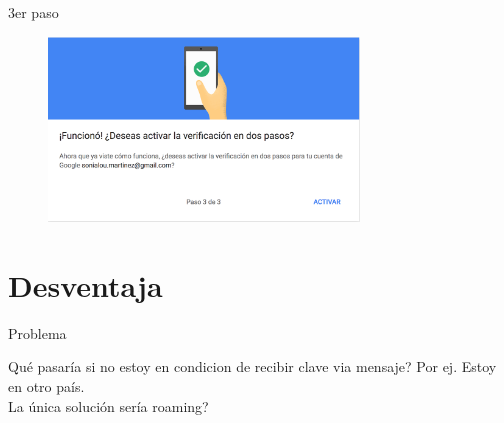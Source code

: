 \documentclass[11pt]{beamer}
\begin{document}
\begin{frame}{3er paso}
  \begin{figure}
    \includegraphics[width=3.25in]{3paso.png}
  \end{figure}
\end{frame}
\section{Desventaja}
\begin{frame}{Problema}
  \begin{block}{Qu\'e pasar\'ia si no estoy en condicion de recibir clave via mensaje?}
    Por ej. Estoy en otro pa\'is. \\
    \color[rgb]{1,0,0} La \'unica soluci\'on ser\'ia roaming?
  \end{block}
\end{frame}
\end{document}
